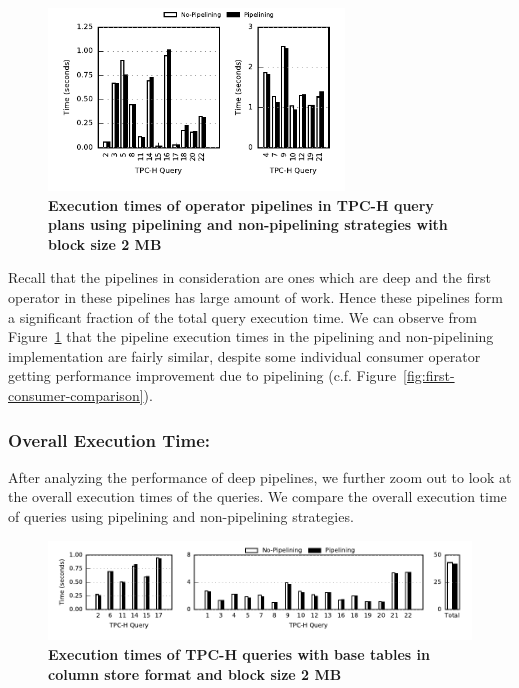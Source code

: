 \begin{figure}[ht]
	\centering 
	\includegraphics[width=0.7\textwidth]{pipeline/figures/deep-pipeline-comparison-2mb-withlip}
	\caption{\textbf{Execution times of operator pipelines in TPC-H query plans using pipelining and non-pipelining strategies with block size 2 MB}}
	\label{fig:deep-pipeline-comparison-2mb}
\end{figure}

Recall that the pipelines in consideration are ones which are deep and the first operator in these pipelines has large amount of work.
Hence these pipelines form a significant fraction of the total query execution time.
We can observe from Figure~\ref{fig:deep-pipeline-comparison-2mb} that the pipeline execution times in the pipelining and non-pipelining implementation are fairly similar, despite some individual consumer operator getting performance improvement due to pipelining (c.f. Figure~\ref{fig:first-consumer-comparison}). 

\subsubsection{Overall Execution Time:}\label{ssec:overall-execution-time} 
After analyzing the performance of deep pipelines, we further zoom out to look at the overall execution times of the queries. 
We compare the overall execution time of queries using pipelining and non-pipelining strategies. 

\begin{figure}[ht]
	\centering
	\includegraphics[width=\textwidth]{pipeline/figures/colstore-20threads-bs2mb-withlip-alltpch}
	\caption{\textbf{Execution times of TPC-H queries with base tables in column store format and block size 2 MB}}
	\label{fig:absolute-times-all-tpch-bs2mb-20threads}
\end{figure}

